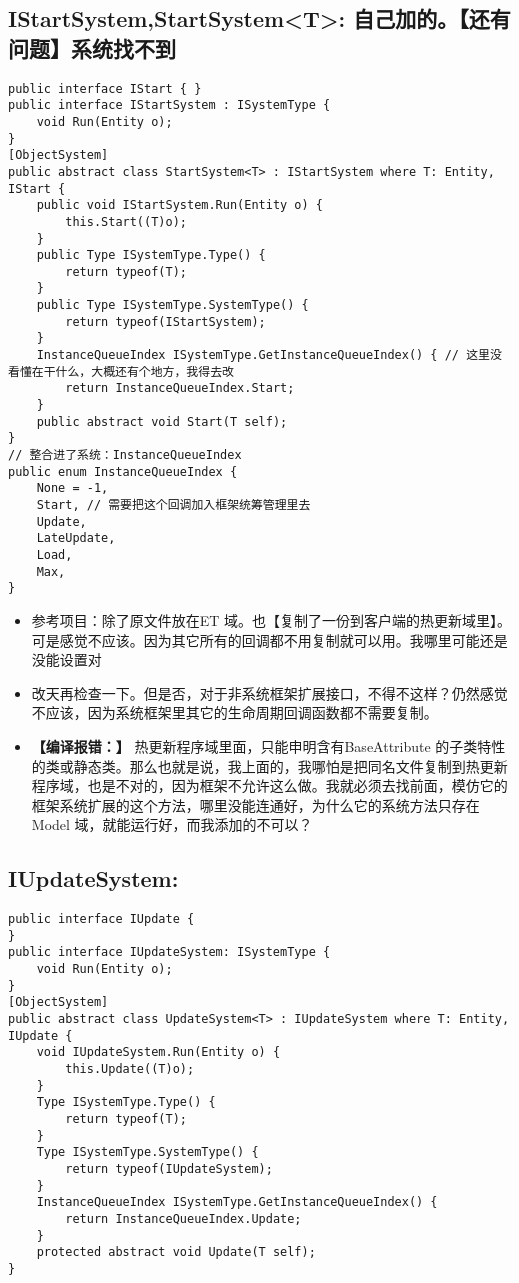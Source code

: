 \documentclass[9pt, b5paper]{article}
\begin{document}
\subsection{IStartSystem,StartSystem<T>: 自己加的。【还有问题】系统找不到}
\label{sec-1-7}
\begin{verbatim}
public interface IStart { }
public interface IStartSystem : ISystemType {
    void Run(Entity o);
}
[ObjectSystem]
public abstract class StartSystem<T> : IStartSystem where T: Entity, IStart {
    public void IStartSystem.Run(Entity o) {
        this.Start((T)o);
    }
    public Type ISystemType.Type() {
        return typeof(T);
    }
    public Type ISystemType.SystemType() {
        return typeof(IStartSystem);
    }
    InstanceQueueIndex ISystemType.GetInstanceQueueIndex() { // 这里没看懂在干什么，大概还有个地方，我得去改
        return InstanceQueueIndex.Start; 
    }
    public abstract void Start(T self);
}
// 整合进了系统：InstanceQueueIndex
public enum InstanceQueueIndex {
    None = -1,
    Start, // 需要把这个回调加入框架统筹管理里去 
    Update,
    LateUpdate,
    Load,
    Max,
}
\end{verbatim}
\begin{itemize}
\item 参考项目：除了原文件放在ET 域。也【复制了一份到客户端的热更新域里】。可是感觉不应该。因为其它所有的回调都不用复制就可以用。我哪里可能还是没能设置对
\item 改天再检查一下。但是否，对于非系统框架扩展接口，不得不这样？仍然感觉不应该，因为系统框架里其它的生命周期回调函数都不需要复制。
\item \textbf{【编译报错：】} 热更新程序域里面，只能申明含有BaseAttribute 的子类特性的类或静态类。那么也就是说，我上面的，我哪怕是把同名文件复制到热更新程序域，也是不对的，因为框架不允许这么做。我就必须去找前面，模仿它的框架系统扩展的这个方法，哪里没能连通好，为什么它的系统方法只存在Model 域，就能运行好，而我添加的不可以？
\end{itemize}
\subsection{IUpdateSystem:}
\label{sec-1-8}
\begin{verbatim}
public interface IUpdate {
}
public interface IUpdateSystem: ISystemType {
    void Run(Entity o);
}
[ObjectSystem]
public abstract class UpdateSystem<T> : IUpdateSystem where T: Entity, IUpdate {
    void IUpdateSystem.Run(Entity o) {
        this.Update((T)o);
    }
    Type ISystemType.Type() {
        return typeof(T);
    }
    Type ISystemType.SystemType() {
        return typeof(IUpdateSystem);
    }
    InstanceQueueIndex ISystemType.GetInstanceQueueIndex() {
        return InstanceQueueIndex.Update;
    }
    protected abstract void Update(T self);
}
\end{verbatim}
\end{document}
